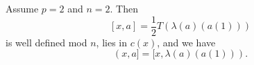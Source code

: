 Assume $p = 2$ and $n = 2$. Then
$$
[x, a] = \frac{1}{2} T(\lambda(a)(a(1)))
$$
is well defined mod $n$, lies in $c(x)$, and we have
$$
(x, a] = [x, \lambda(a)(a(1))).
$$
